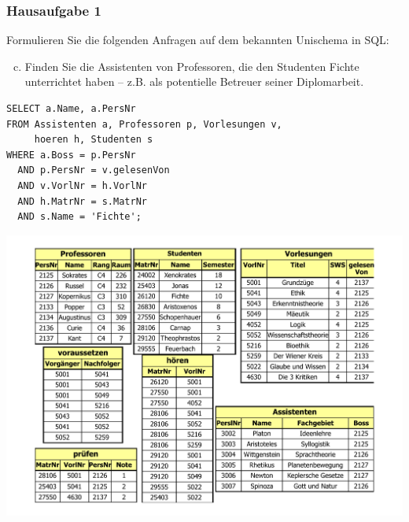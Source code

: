 \begin{frame}[fragile]
	\frametitle{Hausaufgabe 1}
	\vspace{0.25cm}

	\begin{multicols}{2}
		Formulieren Sie die folgenden Anfragen auf dem bekannten Unischema in SQL:
		\begin{enumerate}[a)]
			\setcounter{enumi}{2}
			\item Finden Sie die Assistenten von Professoren, die den Studenten Fichte unterrichtet haben – z.B. als potentielle Betreuer seiner Diplomarbeit.
		\end{enumerate}
		\begin{verbatim}
SELECT a.Name, a.PersNr
FROM Assistenten a, Professoren p, Vorlesungen v, 
	 hoeren h, Studenten s
WHERE a.Boss = p.PersNr
  AND p.PersNr = v.gelesenVon
  AND v.VorlNr = h.VorlNr
  AND h.MatrNr = s.MatrNr
  AND s.Name = 'Fichte';
		\end{verbatim}
		\vfill\columnbreak

		\begin{center}
			\includegraphics[height=.6\paperheight]{../img/uni.pdf}
		\end{center}
	\end{multicols}
\end{frame}


